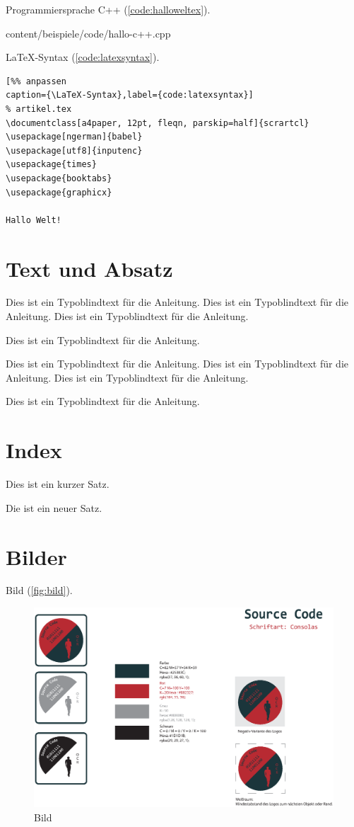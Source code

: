 Programmiersprache C++ (\autoref{code:halloweltex}).
\lstset{language=C++}%

{content/beispiele/code/hallo-c++.cpp}


\LaTeX -Syntax (\autoref{code:latexsyntax}). 
\lstset{language=TeX}%
\begin{lstlisting}[%% anpassen
caption={\LaTeX-Syntax},label={code:latexsyntax}]
% artikel.tex
\documentclass[a4paper, 12pt, fleqn, parskip=half]{scrartcl}
\usepackage[ngerman]{babel}
\usepackage[utf8]{inputenc}
\usepackage{times}
\usepackage{booktabs}
\usepackage{graphicx}

Hallo Welt!

\end{lstlisting}

\section{Text und Absatz}

Dies ist ein Typoblindtext für die Anleitung. Dies ist ein Typoblindtext für die Anleitung.
Dies ist ein Typoblindtext für die Anleitung.

\noindent Dies ist ein Typoblindtext für die Anleitung.

\noindent Dies ist ein Typoblindtext für die Anleitung. Dies ist ein Typoblindtext für die Anleitung.
Dies ist ein Typoblindtext für die Anleitung. 
\vspace{1cm}

\noindent Dies ist ein Typoblindtext für die Anleitung.

\section{Index}

Dies ist ein kurzer  Satz.

\noindent Die ist ein neuer  Satz.

\section{Bilder}\label{sec:bild}

Bild (\autoref{fig:bild}).
\begin{figure}[!h]%
	\centering
	\includegraphics[width=.55\textwidth]{content/beispiele/images/Logo-Details.eps}
	\caption{Bild}\label{fig:bild}%
\end{figure}


